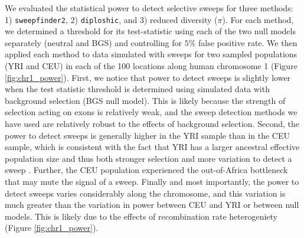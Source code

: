 \documentclass[hidelinks]{article}
\newcommand{\sweepfinder}{\texttt{sweepfinder2}\xspace}
\newcommand{\diploshic}{\texttt{diploshic}\xspace}
\begin{document}
    We evaluated the statistical power to detect selective sweeps for three methods:
    1) \sweepfinder \citep{degiorgio2016sweepfinder2},
    2) \diploshic \citep{kern2018diplos},
    and 3) reduced diversity ($\pi$).
    For each method, we determined a threshold for its test-statistic 
    using each of the two null models separately (neutral and BGS) and controlling 
    for $5\%$ false positive rate.
    We then applied each method to data simulated with sweeps for two sampled populations (YRI and CEU)
    in each of the 100 locations along human chromosome 1 (Figure \ref{fig:chr1_power}).
    First, we notice that power to detect sweeps is slightly lower when the test statistic threshold
    is determined using simulated data with background selection (BGS null model).
    This is likely because the strength of selection acting on exons is relatively weak, and the
    sweep detection methods we have used are relatively robust to the effects of background selection. 
    Second, the power to detect sweeps is generally higher in the YRI sample
    than in the CEU sample, which is consistent with the fact that YRI has a larger ancestral effective population size and
    thus both stronger selection and more variation to detect a sweep \citep[e.g.,][]{simonsen1995properties}.
    Further, the CEU population experienced the out-of-Africa bottleneck
    that may mute the signal of a sweep.  
    Finally and most importantly, the power to detect sweeps varies considerably along the chromosome,
    and this variation is much greater than the variation in power between CEU and YRI or between
    null models. This is likely due to the effects of recombination rate heterogeniety (Figure \ref{fig:chr1_power}).%
\end{document}
